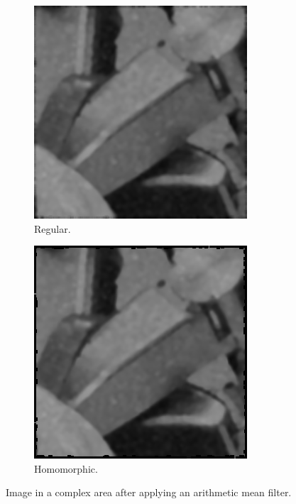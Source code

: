 \begin{figure}[H]
  \begin{subfigure}{\cutOutWidth}
    \includegraphics[width = \textwidth]{graphics/complex1_blurred.png}
    \caption{Regular.}
    \label{fig:complex1_after_blur}
  \end{subfigure}
%
  \begin{subfigure}{\cutOutWidth}
    \includegraphics[width = \textwidth]{graphics/complex1_homomorphic_blurred.png}
    \caption{Homomorphic.}
    \label{fig:complex1_after_homomorphic}
  \end{subfigure}
\caption{Image in a complex area after applying an arithmetic mean filter.}
\end{figure}

